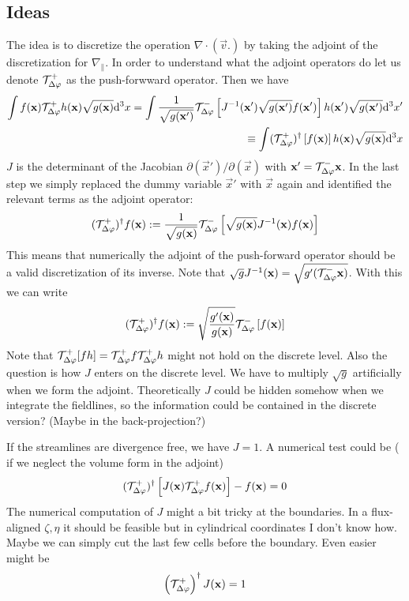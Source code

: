 \subsection{Ideas}
The idea is to discretize the operation $\nabla\cdot( \vec v .)$ by
taking the adjoint of the discretization for $\nabla_\parallel$. 
In order to understand what the adjoint operators do let us denote $\mathcal T^+_{\Delta\varphi}$ as the push-forwward operator. Then we have
\begin{align}
    \int f(\vec x) \Tp h(\vec x) \sqrt{g(\vec x)}\d^3x%
    =  \int \frac{1}{\sqrt{g(\vec x')}}\Tm\left[J^{-1}(\vec x')\sqrt{g(\vec x')}f(\vec x')\right] h(\vec x')\sqrt{g(\vec x')}   \d^3x' \nonumber \\
    \equiv  \int (\Tp)^\dagger\left[f(\vec x)\right] h(\vec x)\sqrt{g(\vec x)}   \d^3x
    \label{}
\end{align}
$J$ is the determinant of the Jacobian $\partial(\vec x')/\partial(\vec x)$ with ${\mathbf{x}}' = \mathcal T^-_{\Delta\varphi} {\mathbf{x}}$.
In the last step we simply replaced the dummy variable $\vec x'$ with $\vec x$ again and identified the relevant terms
as the adjoint operator:
\begin{align}
    (\mathcal T^+_{\Delta\varphi})^\dagger f({\mathbf{x}} ) := \frac{1}{\sqrt{g({\mathbf{x}})}} \mathcal T^-_{\Delta\varphi}\left[\sqrt{g({\mathbf{x}})} J^{-1}({\mathbf{x}}) f({\mathbf{x}}) \right]
    \label{}
\end{align}
This means that numerically the adjoint of the push-forward 
operator should be a valid discretization of its inverse.
Note that $\sqrt{g}J^{-1}({\mathbf{x}}) = \sqrt{g'(\mathcal T^-_{\Delta\varphi} {\mathbf{x}})}$.
With this we can write
\begin{align}
    (\mathcal T^+_{\Delta\varphi})^\dagger f({\mathbf{x}} ) := \sqrt{\frac{g'({\mathbf{x}})}{g({\mathbf{x}})}} \mathcal T^-_{\Delta\varphi}\left[f({\mathbf{x}}) \right]
    \label{}
\end{align}
Note that $\mathcal T^+_{\Delta\varphi} [fh] = \mathcal T^+_{\Delta\varphi} f \mathcal T^+_{\Delta\varphi} h$ might not
hold on the discrete level. Also the question is how $J$ enters 
on the discrete level. We have to multiply $\sqrt{g}$ artificially when we form the adjoint. 
Theoretically $J$ could be hidden somehow when we integrate the fieldlines, so the information could be contained in the discrete version? (Maybe in the back-projection?)

If the streamlines are divergence free, we have $J=1$.
A numerical test could be ( if we neglect the volume form in the adjoint)
\begin{align}
    (\mathcal T^+_{\Delta\varphi})^\dagger \left[J({\mathbf{x}})\mathcal T^+_{\Delta\varphi} f({\mathbf{x}})\right] - f({\mathbf{x}}) = 0
    \label{}
\end{align}
The numerical computation of $J$ might a bit tricky at the boundaries. 
In a flux-aligned $\zeta, \eta$ it should be feasible but in cylindrical coordinates I don't know how. Maybe we can simply cut the last few cells before the boundary.
Even easier might be
\begin{align}
    \left(\mathcal T^+_{\Delta\varphi}\right)^\dagger J({\mathbf{x}} ) = 1
    \label{}
\end{align}

